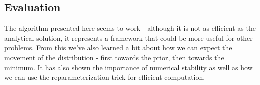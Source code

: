 \subsection{Evaluation}
The algorithm presented here seems to work - although it is not as efficient as the analytical solution, it represents a framework that could be more useful for other problems.
From this we've also learned a bit about how we can expect the movement of the distribution - first towards the prior, then towards the minimum.
It has also shown the importance of numerical stability as well as how we can use the reparameterization trick for efficient computation.

